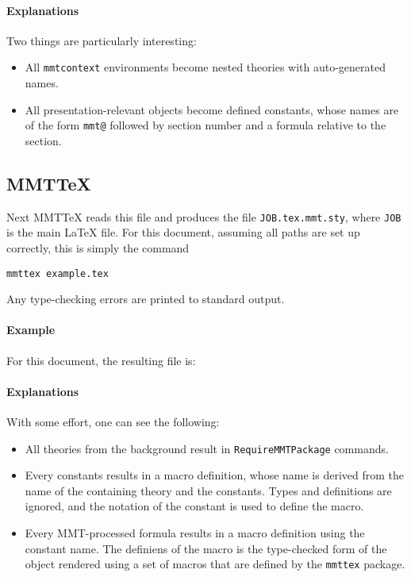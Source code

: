 \documentclass{article}
\begin{document}
\immediate\closeout\mmtfile


\paragraph{Explanations}
Two things are particularly interesting:
\begin{itemize}
\item All \lstinline|mmtcontext| environments become nested theories with auto-generated names.
\item All presentation-relevant objects become defined constants, whose names are of the form \lstinline|mmt@| followed by section number and a formula relative to the section.
\end{itemize}

\subsection{MMTTeX}

Next MMTTeX reads this file and produces the file \lstinline|JOB.tex.mmt.sty|, where \lstinline|JOB| is the main LaTeX file.
For this document, assuming all paths are set up correctly, this is simply the command
\begin{lstlisting}
mmttex example.tex
\end{lstlisting}
Any type-checking errors are printed to standard output.

\paragraph{Example}
For this document, the resulting file is:


\paragraph{Explanations}
With some effort, one can see the following:
\begin{itemize}
\item All theories from the background result in \lstinline|RequireMMTPackage| commands.
\item Every constants results in a macro definition, whose name is derived from the name of the containing theory and the constants.
 Types and definitions are ignored, and the notation of the constant is used to define the macro.
\item Every MMT-processed formula results in a macro definition using the constant name.
 The definiens of the macro is the type-checked form of the object rendered using a set of macros that are defined by the \lstinline|mmttex| package.
\end{itemize}
\end{document}
